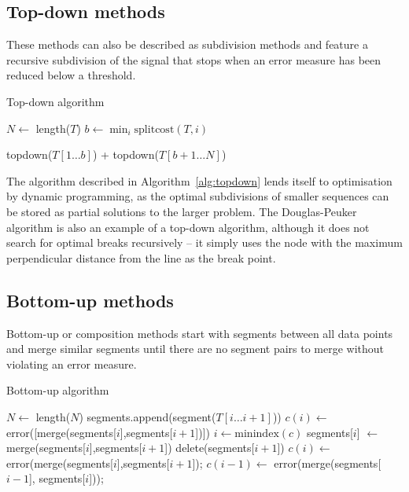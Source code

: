 \subsection{Top-down methods}
These methods can also be described as subdivision methods and feature
a recursive subdivision of the signal that stops when an error measure
has been reduced below a threshold.
\begin{algorithm}
  \caption{Top-down algorithm}
  \label{alg:topdown}
  \begin{algorithmic}
       
    \Else
      \State $N \gets $ length($T$)
      \State $b \gets \min_i{\mathrm{splitcost}(T,i)}$ 
  
      \Return topdown($T[1\dots b]$) + topdown($T[b+1\dots N]$) 
      \EndIf
    \EndFunction
\end{algorithmic}
\end{algorithm}
The algorithm described in Algorithm~\ref{alg:topdown} lends itself to
optimisation by dynamic programming, as the optimal subdivisions of
smaller sequences can be stored as partial solutions to the larger
problem.  The Douglas-Peuker algorithm \citep{douglas_algorithms_1973} is also an example of a
top-down algorithm, although it does not search for optimal breaks
recursively -- it simply uses the node with the maximum perpendicular
distance from the line as the break point.

\subsection{Bottom-up methods}
Bottom-up or composition methods start with segments between
all data points and merge similar segments until there are no segment
pairs to merge without violating an error measure.

\begin{algorithm}
  \caption{Bottom-up algorithm}
  \label{alg:bottomup}
  \begin{algorithmic}
    \State $N \gets $ length($N$)
     
    \State segments.append(segment($T[i\dots i+1]$))
    \EndFor
     
    \State $c(i) \gets $error([merge(segments[$i$],segments[$i+1$])])
    \EndFor
    \State $i \gets \mathrm{minindex}(c)$ 
    \State segments[$i$] $\gets$ merge(segments[$i$],segments[$i+1$]) 
    \State delete(segments[$i+1$]) 
    \State $c(i) \gets $error(merge(segments[$i$],segments[$i+1$]); 
    \State $c(i-1) \gets $ error(merge(segments[$i-1$], segments[$i$])); 
    \EndWhile
    \EndFunction
  \end{algorithmic}
\end{algorithm}

